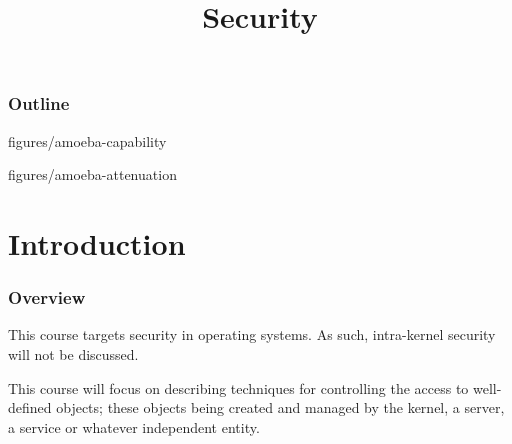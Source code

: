 %
%
%
%
%
%

%
%

%
%

\def\path{../../..}

%
%



%
%

\title{Security}

%
%



%
%

\begin{frame}
  \titlepage
\end{frame}

%
%

\begin{frame}
  \frametitle{Outline}

  \tableofcontents
\end{frame}

%
%

                {figures/amoeba-capability}

                {figures/amoeba-attenuation}

%
%

%
%

\section{Introduction}


\begin{frame}
  \frametitle{Overview}

  This course targets security in operating systems. As such, intra-kernel
  security will not be discussed.

  \-

  This course will focus on describing techniques for controlling the access to
  well-defined objects; these objects being created and managed by the kernel,
  a server, a service or whatever independent entity.
\end{frame}

